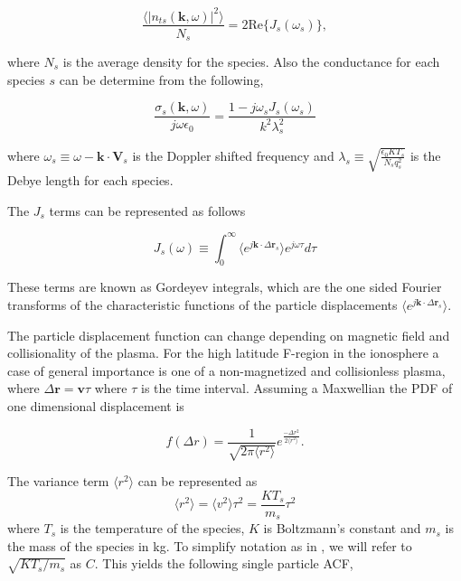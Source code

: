 \begin{equation}
\label{eq:thermalfl}
\frac{\langle|n_{ts}(\mathbf{k},\omega)|^2\rangle}{N_s} = 2\text{Re}\{J_s(\omega_s)\},
\end{equation}

\noindent where $N_s$ is the average density for the species.  Also the conductance for each species $s$ can be determine from the following,

\begin{equation}
\label{eq:cond}
\frac{\sigma_{s}(\mathbf{k},\omega)}{j\omega\epsilon_0} = \frac{1-j\omega_s J_s(\omega_s)}{k^2\lambda_s^2}
\end{equation}

\noindent where $\omega_s \equiv \omega-\mathbf{k}\cdot\mathbf{V}_s $ is the Doppler shifted frequency and $\lambda_s \equiv \sqrt{\frac{\epsilon_0 KT_s}{N_s q_s^2}}$ is the Debye length for each species.

The $J_s$ terms can be represented as follows

\begin{equation}
\label{eq:gord}
J_s(\omega)\equiv \int_0^\infty \langle e^{j\mathbf{k}\cdot\Delta \mathbf{r}_s}\rangle e^{j\omega\tau}d\tau
\end{equation}

\noindent These terms are known as Gordeyev integrals, which are the one sided Fourier transforms of the characteristic functions of the particle displacements $\langle e^{j\mathbf{k}\cdot\Delta\mathbf{r}_s}\rangle$.  

The particle displacement function can change depending on magnetic field and collisionality of the plasma. For the high latitude F-region in the ionosphere a case of general importance is one of a non-magnetized and collisionless plasma, where $\Delta\mathbf{r} = \mathbf{v}\tau$ where $\tau$ is the time interval. Assuming a Maxwellian the PDF of one dimensional displacement is

\begin{equation}
\label{eq:pdfr}
f(\Delta r) = \frac{1}{\sqrt{2\pi \langle r^2 \rangle}}e^{\frac{-\Delta r^2}{2\langle r^2\rangle}}.
\end{equation}
 
\noindent The variance term $\langle r^2 \rangle$ can be represented as
\begin{equation}
\label{eq:var}
\langle r^2 \rangle = \langle v^2 \rangle \tau^2 = \frac{KT_s}{m_s} \tau^2
\end{equation}
 \noindent where $T_s$ is the temperature of the species, $K$ is Boltzmann's constant and $m_s$ is the mass of the species in kg. To simplify notation as in \citet{kudeki:milla:1}, we will refer to $\sqrt{KT_s/m_s}$ as $C$. This yields the following single particle ACF,
 
